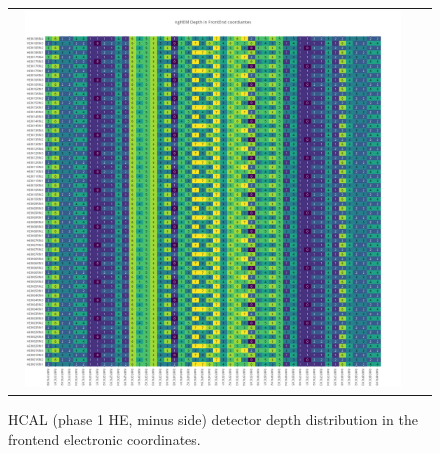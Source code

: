 \begin{figure}[htb]
 \begin{center}
  \begin{tabular}{cc}
   \includegraphics[angle=0,width=0.95\textwidth]{figures/appendix/ngHEM_Depth_in_FrontEnd.png}
  \end{tabular}
  \caption{HCAL (phase 1 HE, minus side) detector depth distribution in the frontend electronic coordinates.}
  \label{fig:lmapngHEMDepthFEC}
 \end{center}
\end{figure}
\clearpage

